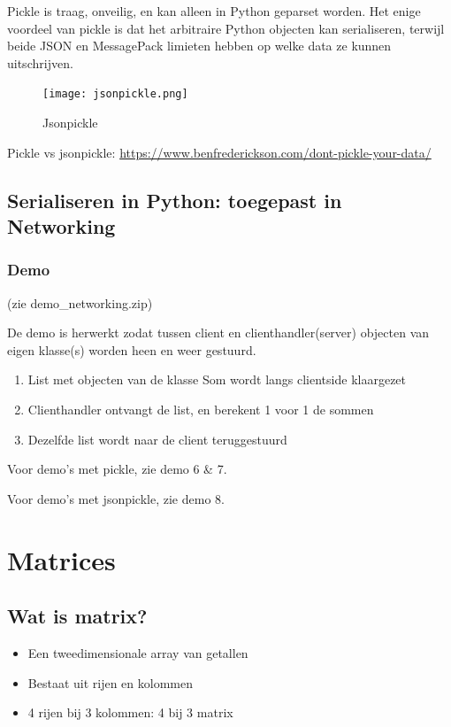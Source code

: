 \documentclass{article}
\begin{document}
Pickle is traag, onveilig, en kan alleen in Python geparset worden. 
Het enige voordeel van pickle is dat het arbitraire Python objecten kan serialiseren,
terwijl beide JSON en MessagePack limieten hebben op welke data ze kunnen uitschrijven.

\begin{figure}[H]
    \centering
    \texttt{[image: jsonpickle.png]}
    \caption{Jsonpickle}
\end{figure}

Pickle vs jsonpickle: \url{https://www.benfrederickson.com/dont-pickle-your-data/}

\subsection{Serialiseren in Python: toegepast in Networking}

\subsubsection{Demo}

(zie demo\_networking.zip)

De demo is herwerkt zodat tussen client en clienthandler(server) objecten van 
eigen klasse(s) worden heen en weer gestuurd. 

\begin{enumerate}
    \item List met objecten van de klasse Som wordt langs clientside klaargezet
    \item Clienthandler ontvangt de list, en berekent 1 voor 1 de sommen
    \item Dezelfde list wordt naar de client teruggestuurd
\end{enumerate}

Voor demo's met pickle, zie demo 6 \& 7.

Voor demo's met jsonpickle, zie demo 8.

\section{Matrices}

\subsection{Wat is matrix?}

\begin{itemize}
    \item Een tweedimensionale array van getallen
    \item Bestaat uit rijen en kolommen
    \item 4 rijen bij 3 kolommen: 4 bij 3 matrix
\end{itemize}
\end{document}
